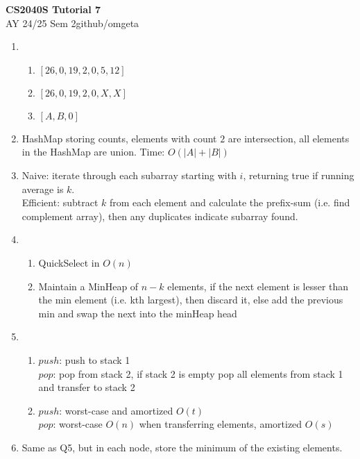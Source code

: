 \documentclass[12pt, a4paper]{article}
\newcommand{\mytitle}{CS2040S Tutorial 7}
\newcommand{\myauthor}{github/omgeta}
\newcommand{\mydate}{AY 24/25 Sem 2}
\begin{document}
\raggedright
\footnotesize
\begin{center}
{\normalsize{\textbf{\mytitle}}} \\
{\footnotesize{\mydate\hspace{2pt}\textemdash\hspace{2pt}\myauthor}}
\end{center}
\begin{enumerate}[Q\arabic*.]
  \item 
    \begin{enumerate}[(\alph*)]
      \item $[26, 0, 19, 2, 0, 5, 12]$ 

      \item $[26, 0, 19, 2, 0, X, X]$ 

      \item $[A, B, 0]$
    \end{enumerate}

  \item HashMap storing counts, elements with count $2$ are intersection, all elements in the HashMap are union. Time: $O(|A| + |B|)$

  \item Naive: iterate through each subarray starting with $i$, returning true if running average is $k$.\\
    Efficient: subtract $k$ from each element and calculate the prefix-sum (i.e. find complement array), then any duplicates indicate subarray found.

  \item 
    \begin{enumerate}[(\alph*.)]
    
      \item QuickSelect in $O(n)$

      \item Maintain a MinHeap of $n-k$ elements, if the next element is lesser than the min element (i.e. kth largest), then discard it, else add the previous min and swap the next into the minHeap head 
    \end{enumerate}

  \item
    \begin{enumerate}[(\alph*.)]
      \item $push$: push to stack 1\\
        $pop$: pop from stack 2, if stack 2 is empty pop all elements from stack 1 and transfer to stack 2

      \item $push$: worst-case and amortized $O(t)$\\
        $pop$: worst-case $O(n)$ when transferring elements, amortized $O(s)$
    \end{enumerate}

  \item Same as Q5, but in each node, store the minimum of the existing elements. 
\end{enumerate}
\end{document}

